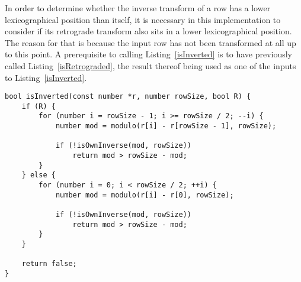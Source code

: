 In order to determine whether the inverse transform of a row has a lower lexicographical position than itself, it is necessary in this implementation to consider if its retrograde transform also sits in a lower lexicographical position. The reason for that is because the input row has not been transformed at all up to this point. A prerequisite to calling Listing~\ref{isInverted} is to have previously called Listing~\ref{isRetrograded}, the result thereof being used as one of the inputs to Listing~\ref{isInverted}.

\begin{lstlisting}[caption={Determining whether a representative of a row class is inverted.},label={isInverted}]
bool isInverted(const number *r, number rowSize, bool R) {
    if (R) {
        for (number i = rowSize - 1; i >= rowSize / 2; --i) {
            number mod = modulo(r[i] - r[rowSize - 1], rowSize);

            if (!isOwnInverse(mod, rowSize))
                return mod > rowSize - mod;
        }
    } else {
        for (number i = 0; i < rowSize / 2; ++i) {
            number mod = modulo(r[i] - r[0], rowSize);

            if (!isOwnInverse(mod, rowSize))
                return mod > rowSize - mod;
        }
    }

    return false;
}
\end{lstlisting}

